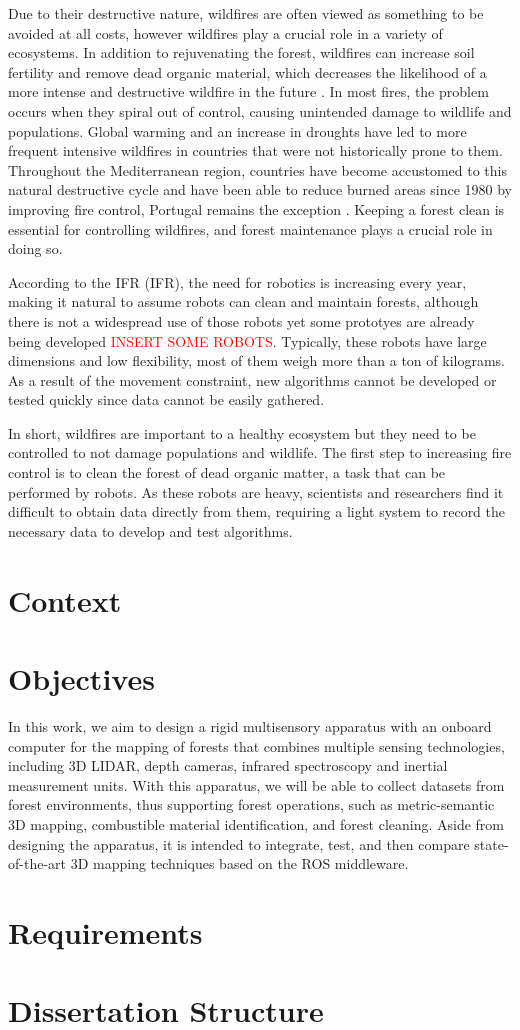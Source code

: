 Due to their destructive nature, wildfires are often viewed as something to be avoided at all costs, however wildfires play a crucial role in a variety of ecosystems. In addition to rejuvenating the forest, wildfires can increase soil fertility and remove dead organic material, which decreases the likelihood of a more intense and destructive wildfire in the future \cite{bond_fires_2017}. In most fires, the problem occurs when they spiral out of control, causing unintended damage to wildlife and populations. Global warming and an increase in droughts have led to more frequent intensive wildfires in countries that were not historically prone to them. Throughout the Mediterranean region, countries have become accustomed to this natural destructive cycle and have been able to reduce burned areas since 1980 by improving fire control, Portugal remains the exception \cite{turco_decreasing_2016}\cite{european_commission_joint_research_centre_forest_2021}. Keeping a forest clean is essential for controlling wildfires, and forest maintenance plays a crucial role in doing so.

According to the \acl{IFR} (\acs{IFR}), the need for robotics is increasing every year, making it natural to assume robots can clean and maintain forests, although there is not a widespread use of those robots yet some prototyes are already being developed \textcolor{red}{INSERT SOME ROBOTS}. Typically, these robots have large dimensions and low flexibility, most of them weigh more than a ton of kilograms. As a result of the movement constraint, new algorithms cannot be developed or tested quickly since data cannot be easily gathered.

In short, wildfires are important to a healthy ecosystem but they need to be controlled to not damage populations and wildlife. The first step to increasing fire control is to clean the forest of dead organic matter, a task that can be performed by robots. As these robots are heavy, scientists and researchers find it difficult to obtain data directly from them, requiring a light system to record the necessary data to develop and test algorithms.

\section{Context}

\section{Objectives}
In this work, we aim to design a rigid multisensory apparatus  with an onboard computer for the mapping of forests that combines multiple sensing technologies, including 3D LIDAR, depth cameras, infrared spectroscopy and inertial measurement units. With this apparatus, we will be able to collect datasets from forest environments, thus supporting forest operations, such as metric-semantic 3D mapping, combustible material identification, and forest cleaning. Aside from designing the apparatus, it is intended to integrate, test, and then compare state-of-the-art 3D mapping techniques based on the ROS middleware.

\section{Requirements}

\section{Dissertation Structure}